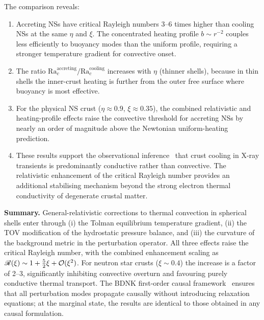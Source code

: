 The comparison reveals:
\begin{enumerate}
\item[(i)] Accreting NSs have critical Rayleigh numbers 3--6 times
  higher than cooling NSs at the same $\eta$ and $\xi$.  The
  concentrated heating profile $b \sim r^{-2}$ couples less
  efficiently to buoyancy modes than the uniform profile, requiring
  a stronger temperature gradient for convective onset.

\item[(ii)] The ratio $\mathrm{Ra}_{c}^{\mathrm{accreting}} /
  \mathrm{Ra}_{c}^{\mathrm{cooling}}$ increases with $\eta$
  (thinner shells), because in thin shells the inner-crust heating
  is further from the outer free surface where buoyancy is most
  effective.

\item[(iii)] For the physical NS crust ($\eta \approx 0.9$,
  $\xi \approx 0.35$), the combined relativistic and
  heating-profile effects raise the convective threshold for
  accreting NSs by nearly an order of magnitude above the
  Newtonian uniform-heating prediction.

\item[(iv)] These results support the observational
  inference~\cite{WijnandsEtAl2017} that crust cooling in
  X-ray transients is predominantly conductive rather than
  convective.  The relativistic enhancement of the critical
  Rayleigh number provides an additional stabilising mechanism
  beyond the strong electron thermal conductivity of degenerate
  crustal matter.
\end{enumerate}

\bigskip
\noindent\textbf{Summary.}  General-relativistic corrections to
thermal convection in spherical shells enter through (i) the Tolman
equilibrium temperature gradient, (ii) the TOV modification of the
hydrostatic pressure balance, and (iii) the curvature of the
background metric in the perturbation operator.  All three effects
raise the critical Rayleigh number, with the combined enhancement
scaling as $\mathscr{R}(\xi)\sim 1+\frac{5}{2}\xi+\mathcal{O}(\xi^{2})$.
For neutron star crusts ($\xi\sim 0.4$) the increase is a factor of
2--3, significantly inhibiting convective overturn and favouring
purely conductive thermal transport.  The BDNK first-order causal
framework~\cite{BemficaDN2018,Kovtun2019} ensures that all perturbation
modes propagate causally without introducing relaxation equations;
at the marginal state, the results are identical to those obtained
in any causal formulation.

